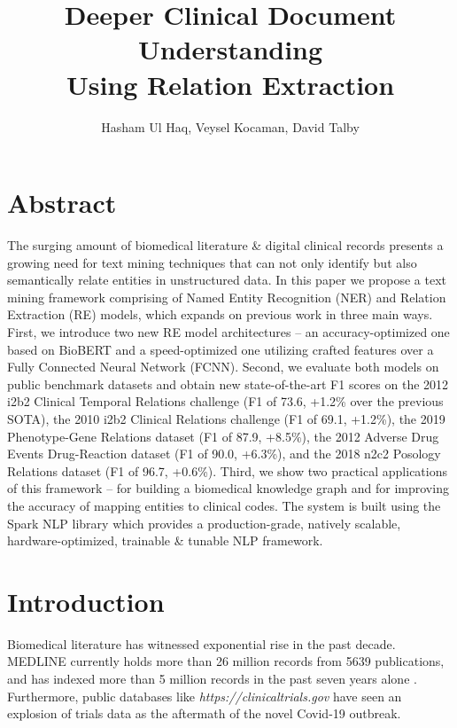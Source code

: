 \documentclass[letterpaper]{article}
\title{Deeper Clinical Document Understanding\\ Using Relation Extraction}
\author{
Hasham Ul Haq,
    Veysel Kocaman,
    David Talby
}
\begin{document}
\maketitle

\section{Abstract}





The surging amount of biomedical literature \& digital clinical records presents a growing need for text mining techniques that can not only identify but also semantically relate entities in unstructured data. In this paper we propose a text mining framework comprising of Named Entity Recognition (NER) and Relation Extraction (RE) models, which expands on previous work in three main ways. First, we introduce two new RE model architectures – an accuracy-optimized one based on BioBERT and a speed-optimized one utilizing crafted features over a Fully Connected Neural Network (FCNN). Second, we evaluate both models on public benchmark datasets and obtain new state-of-the-art F1 scores on the 2012 i2b2 Clinical Temporal Relations challenge (F1 of 73.6, +1.2\% over the previous SOTA), the 2010 i2b2 Clinical Relations challenge (F1 of 69.1, +1.2\%), the 2019 Phenotype-Gene Relations dataset (F1 of 87.9, +8.5\%), the 2012 Adverse Drug Events Drug-Reaction dataset (F1 of 90.0, +6.3\%), and the 2018 n2c2 Posology Relations dataset (F1 of 96.7, +0.6\%). Third, we show two practical applications of this framework – for building a biomedical knowledge graph and for improving the accuracy of mapping entities to clinical codes. The system is built using the Spark NLP library which provides a production-grade, natively scalable, hardware-optimized, trainable \& tunable NLP framework.

\section{Introduction}

Biomedical literature has witnessed exponential rise in the past decade. MEDLINE currently holds more than 26 million records from 5639 publications, and has indexed more than 5 million records in the past seven years alone \cite{DBLP:journals/corr/abs-2009-09509}. Furthermore, public databases like \textit{https://clinicaltrials.gov} have seen an explosion of trials data as the aftermath of the novel Covid-19 outbreak.
\end{document}
